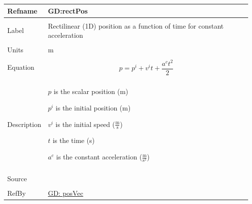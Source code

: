 \documentclass[12pt]{article}
\begin{document}
\noindent \begin{minipage}{\textwidth}
          \begin{tabular}{>{\raggedright}p{}>{\raggedright\arraybackslash}p{}}
          \toprule \textbf{Refname} & \textbf{GD:rectPos}
          \label{GD:rectPos}
          \\ \midrule \\
          Label & Rectilinear (1D) position as a function of time for constant acceleration
          \\ \midrule \\
          Units & m
          \\ \midrule \\
          Equation & \begin{displaymath}
                     p={p^{i}}+{v^{i}} t+\frac{{a^{c}} t^{2}}{2}
                     \end{displaymath}
          \\ \midrule \\
          Description & \begin{symbDescription}
                        \item{$p$ is the scalar position (m)}
                        \item{${p^{i}}$ is the initial position (m)}
                        \item{${v^{i}}$ is the initial speed ($\frac{\text{m}}{\text{s}}$)}
                        \item{$t$ is the time (s)}
                        \item{${a^{c}}$ is the constant acceleration ($\frac{\text{m}}{\text{s}^{2}}$)}
                        \end{symbDescription}
          \\ \midrule \\
          Source & \cite[(pg. 8)]{hibbeler2004}
          \\ \midrule \\
          RefBy & \hyperref[GD:posVec]{GD: posVec}
          \\ \bottomrule
          \end{tabular}
          \end{minipage}
\end{document}
